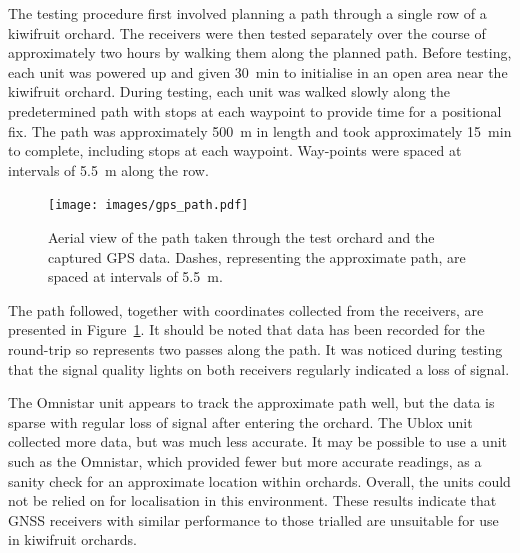 \documentclass[preprint,authoryear,12pt]{elsarticle}
\begin{document}
        The testing procedure first involved planning a path through a single row of a kiwifruit orchard.
        The receivers were then tested separately over the course of approximately two hours by walking them along the planned path.
        Before testing, each unit was powered up and given \SI{30}{\minute} to initialise in an open area near the kiwifruit orchard.
        During testing, each unit was walked slowly along the predetermined path with stops at each waypoint to provide time for a positional fix.
        The path was approximately \SI{500}{\meter} in length and took approximately \SI{15}{\minute} to complete, including stops at each waypoint.
        Way-points were spaced at intervals of \SI{5.5}{\meter} along the row.

        \begin{figure}[htb]
            \centering
            \texttt{[image: images/gps\_path.pdf]}
            \caption{
                Aerial view of the path taken through the test orchard and the captured GPS data.
                Dashes, representing the approximate path, are spaced at intervals of \SI{5.5}{\meter}.
            }
            \label{fig:gpsResults}
        \end{figure}

        The path followed, together with coordinates collected from the receivers, are presented in Figure~\ref{fig:gpsResults}.
        It should be noted that data has been recorded for the round-trip so represents two passes along the path.
        It was noticed during testing that the signal quality lights on both receivers regularly indicated a loss of signal.

        The Omnistar unit appears to track the approximate path well, but the data is sparse with regular loss of signal after entering the orchard.
        The Ublox unit collected more data, but was much less accurate.
        It may be possible to use a unit such as the Omnistar, which provided fewer but more accurate readings, as a sanity check for an approximate location within orchards.
        Overall, the units could not be relied on for localisation in this environment.
        These results indicate that GNSS receivers with similar performance to those trialled are unsuitable for use in kiwifruit orchards.
\end{document}
